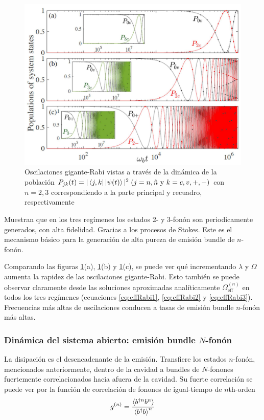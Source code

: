 \documentclass[main.tex]{subfiles}
\begin{document}
\begin{figure}[th]
	\centering
	\includegraphics[width=0.7\linewidth]{img/super-Rabi}
	\caption{Oscilaciones gigante-Rabi vistas a través de la dinámica de la población $P_{jk}(t) = |\bra{j,k}\ket{\psi(t)}|^2\; (j=n,\tilde{n} \text{ y } k=c,v,+,-)$ con $n=2,3$ correspondiendo a la parte principal y recuadro, respectivamente \parencite{Bin2020}}
	\label{fig:super-rabi}
\end{figure}

Muestran que en los tres regímenes los estados 2- y 3-fonón son periodicamente generados, con alta fidelidad. Gracias a los procesos de Stokes. Este es el mecanismo básico para la generación de alta pureza de emisión bundle de $n$-fonón.

Comparando las figuras \ref{fig:super-rabi}(a), \ref{fig:super-rabi}(b) y \ref{fig:super-rabi}(c), se puede ver qué incrementando $\lambda$ y $\Omega$ aumenta la rapidez de las oscilaciones gigante-Rabi. Esto también se puede observar claramente desde las soluciones aproximadas analíticamente $\Omega_\text{eff}^{(n)}$ en todos los tres regímenes (ecuaciones \ref{eq:effRabi1}, \ref{eq:effRabi2} y \ref{eq:effRabi3}). Frecuencias más altas de oscilaciones conducen a tasas de emisión bundle $n$-fonón más altas.

\subsubsection{Dinámica del sistema abierto: emisión bundle $N$-fonón}
La disipación es el desencadenante de la emisión. Transfiere los estados $n$-fonón, mencionados anteriormente, dentro de la cavidad a bundles de $N$-fonones fuertemente correlacionados hacia afuera de la cavidad. Su fuerte correlación se puede ver por la función de correlación de fonones de igual-tiempo de $n$th-orden
\begin{equation}
	g^{(n)} = \frac{\braket{b^{\dagger n}b^n}}{\braket{b^\dagger b}^n}
\end{equation}
\end{document}
